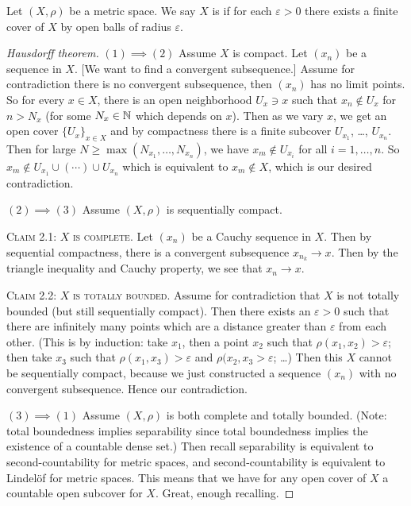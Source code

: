 \begin{definition}
Let $(X,\rho)$ be a metric space. We say $X$ is 
if for each $\varepsilon>0$ there exists a finite cover of $X$ by open
balls of radius $\varepsilon$.
\end{definition}

\begin{proof}[Hausdorff theorem]
$(1)\implies(2)$ Assume $X$ is compact.
Let $(x_{n})$ be a sequence in $X$.
[We want to find a convergent subsequence.]
Assume for contradiction there is no convergent subsequence, then
$(x_{n})$ has no limit points. So for every $x\in X$, there is an open
neighborhood $U_{x}\ni x$ such that $x_{n}\notin U_{x}$ for $n>N_{x}$ (for
some $N_{x}\in\mathbb{N}$ which depends on $x$). Then as we vary $x$, we get
an open cover $\{U_{x}\}_{x\in X}$ and by compactness there is a
finite subcover $U_{x_{1}}$, \dots, $U_{x_{n}}$. Then for large $N\geq\max(N_{x_{1}},\dots,N_{x_{n}})$,
we have $x_{m}\notin U_{x_{i}}$ for all $i=1,\dots,n$. So $x_{m}\notin U_{x_{1}}\cup(\cdots)\cup U_{x_{n}}$
which is equivalent to $x_{m}\notin X$, which is our desired contradiction.

$(2)\implies(3)$ Assume $(X,\rho)$ is sequentially compact.

\textsc{Claim 2.1: $X$ is complete}. Let $(x_{n})$ be a Cauchy
sequence in $X$. Then by sequential compactness, there is a convergent
subsequence $x_{n_{k}}\to x$. Then by the triangle inequality and
Cauchy property, we see that $x_{n}\to x$.

\textsc{Claim 2.2: $X$ is totally bounded}.
Assume for contradiction that $X$ is not totally bounded (but still
sequentially compact). Then there exists an $\varepsilon>0$ such that
there are infinitely many points which are a distance greater than
$\varepsilon$ from each other. (This is by induction: take $x_{1}$,
then a point $x_{2}$ such that $\rho(x_{1},x_{2})>\varepsilon$; then
take $x_{3}$ such that $\rho(x_{1},x_{3})>\varepsilon$ and
$\rho(x_{2},x_{3}>\varepsilon$; \dots) Then this $X$ cannot be sequentially
compact, because we just constructed a sequence $(x_{n})$ with no
convergent subsequence. Hence our contradiction.

$(3)\implies(1)$ Assume $(X,\rho)$ is both complete and totally bounded.
(Note: total boundedness implies separability since total boundedness
implies the existence of a countable dense set.) Then recall
separability is equivalent to second-countability for metric spaces,
and second-countability is equivalent to Lindel\"{o}f for metric
spaces. This means that we have for any open cover of $X$ a countable open subcover for $X$.
Great, enough recalling.


\end{proof}
